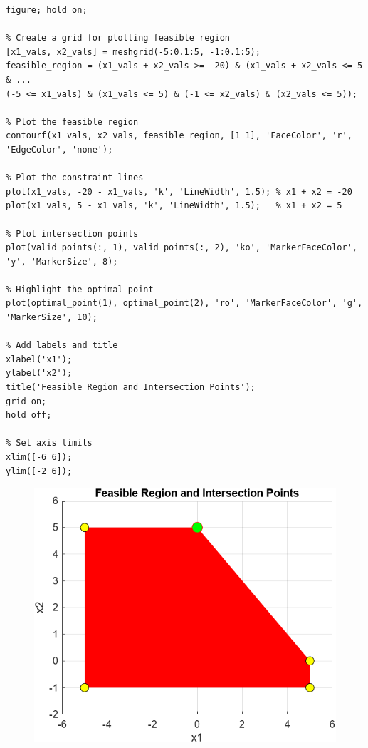 \begin{latin}
\begin{lstlisting}[frame=single,style=Matlab-Pyglike]
% Step 7: Plot the feasible region and the intersection points
figure; hold on;

% Create a grid for plotting feasible region
[x1_vals, x2_vals] = meshgrid(-5:0.1:5, -1:0.1:5);
feasible_region = (x1_vals + x2_vals >= -20) & (x1_vals + x2_vals <= 5 & ...
(-5 <= x1_vals) & (x1_vals <= 5) & (-1 <= x2_vals) & (x2_vals <= 5));

% Plot the feasible region
contourf(x1_vals, x2_vals, feasible_region, [1 1], 'FaceColor', 'r', 'EdgeColor', 'none');

% Plot the constraint lines
plot(x1_vals, -20 - x1_vals, 'k', 'LineWidth', 1.5); % x1 + x2 = -20
plot(x1_vals, 5 - x1_vals, 'k', 'LineWidth', 1.5);   % x1 + x2 = 5

% Plot intersection points
plot(valid_points(:, 1), valid_points(:, 2), 'ko', 'MarkerFaceColor', 'y', 'MarkerSize', 8);

% Highlight the optimal point
plot(optimal_point(1), optimal_point(2), 'ro', 'MarkerFaceColor', 'g', 'MarkerSize', 10);

% Add labels and title
xlabel('x1');
ylabel('x2');
title('Feasible Region and Intersection Points');
grid on;
hold off;

% Set axis limits
xlim([-6 6]);
ylim([-2 6]);

	\end{lstlisting}
\end{latin}


\begin{figure}[H]
	\centering
	\includegraphics[width=1\linewidth]{../img/Q2_1}
	\caption{}
	\label{fig:q21}
\end{figure}

